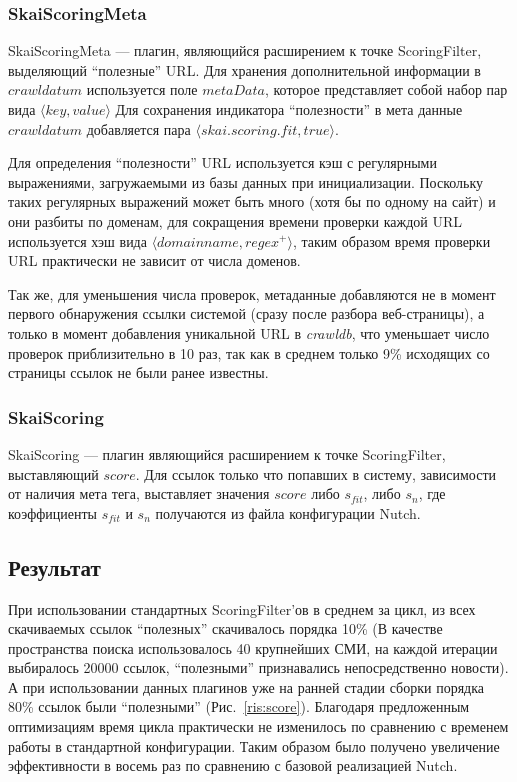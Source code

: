 \subsubsection*{SkaiScoringMeta}
\label{sec:scoringmeta}
SkaiScoringMeta --- плагин, являющийся расширением к точке ScoringFilter, выделяющий ``полезные'' URL. Для хранения дополнительной информации в $crawldatum$ используется поле $metaData$, которое представляет собой набор пар вида $\langle key, value\rangle$
Для сохранения индикатора ``полезности'' в мета данные $crawldatum$ добавляется пара $\langle skai.scoring.fit, true\rangle$.

Для определения ``полезности'' URL используется кэш с регулярными выражениями, загружаемыми из базы данных при инициализации. Поскольку таких регулярных выражений может быть много (хотя бы по одному на сайт) и они разбиты по доменам, для сокращения времени проверки каждой URL используется хэш вида $\langle domainname, regex^{+}\rangle$, таким образом время проверки URL практически не зависит от числа доменов.

Так же, для уменьшения числа проверок, метаданные добавляются не в момент первого обнаружения ссылки системой (сразу после разбора веб-страницы), а только в момент добавления уникальной URL в \textit{crawldb}, что уменьшает число проверок приблизительно в 10 раз, так как в среднем только 9\% исходящих со страницы ссылок не были ранее известны.
\subsubsection*{SkaiScoring}
SkaiScoring --- плагин являющийся расширением к точке ScoringFilter, выставляющий $score$. Для ссылок только что попавших в систему, зависимости от наличия мета тега, выставляет значения $score$ либо $s_{fit}$, либо $s_{n}$, где коэффициенты $s_{fit}$ и $s_{n}$ получаются из файла конфигурации Nutch.
\subsection{Результат}
При использовании стандартных ScoringFilter'ов в среднем за цикл, из всех скачиваемых ссылок ``полезных'' скачивалось порядка 10\% (В качестве пространства поиска использовалось 40 крупнейших СМИ, на каждой итерации выбиралось 20000 ссылок, ``полезными'' признавались непосредственно новости). А при использовании данных плагинов уже на ранней стадии сборки порядка 80\% ссылок были ``полезными'' (Рис.~\ref{ris:score}). Благодаря предложенным оптимизациям время цикла практически не изменилось по сравнению с временем работы в стандартной конфигурации. Таким образом было получено увеличение эффективности в восемь раз по сравнению с базовой реализацией Nutch.

